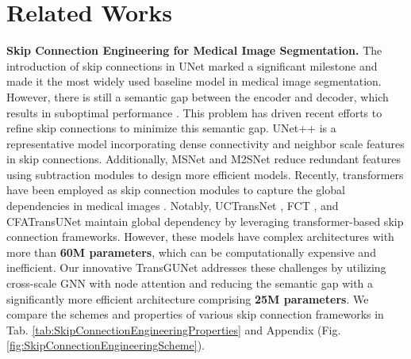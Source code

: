 \section{Related Works}

\noindent \textbf{Skip Connection Engineering for Medical Image Segmentation.} The introduction of skip connections in UNet marked a significant milestone and made it the most widely used baseline model in medical image segmentation. However, there is still a semantic gap between the encoder and decoder, which results in suboptimal performance \cite{mahmud2021covsegnet}. This problem has driven recent efforts to refine skip connections to minimize this semantic gap. UNet++ is a representative model incorporating dense connectivity and neighbor scale features in skip connections. Additionally, MSNet \cite{zhao2021automatic} and M2SNet \cite{zhao2023m} reduce redundant features using subtraction modules to design more efficient models. Recently, transformers have been employed as skip connection modules to capture the global dependencies in medical images \cite{gao2021utnet, heidari2023hiformer}. Notably, UCTransNet \cite{wang2022uctransnet}, FCT \cite{tragakis2023fully}, and CFATransUNet \cite{wang2024cfatransunet} maintain global dependency by leveraging transformer-based skip connection frameworks. However, these models have complex architectures with more than \textbf{60M parameters}, which can be computationally expensive and inefficient. Our innovative TransGUNet addresses these challenges by utilizing cross-scale GNN with node attention and reducing the semantic gap with a significantly more efficient architecture comprising \textbf{25M parameters}. We compare the schemes and properties of various skip connection frameworks in Tab. \ref{tab:SkipConnectionEngineeringProperties} and Appendix (Fig. \ref{fig:SkipConnectionEngineeringScheme}).

